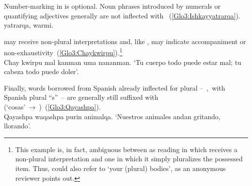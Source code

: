 {\noindent
Number-marking in \SYQ{} is optional. Noun phrases introduced by numerals or quantifying adjectives generally are not inflected with ~(\ref{Glo3:Ishkayyatrarqa}).\\

%
{ yatrarqa,  warmi.}%
{}%
{}{}%

\noindent
{} may receive non-plural interpretations and, like , may indicate accompaniment or non-exhaustivity~(\ref{Glo3:Chaykwirpu}).\footnote{This example is, in fact, ambiguous between as reading in which  receives a non-plural interpretation and one in which it simply pluralizes the possessed item. Thus,  could also refer to ‘your (plural) bodies’, as an anonymous reviewer points out.}\\

%
{Chay kwirpu mal kanman uma nananman.}%
{}%
{‘Tu cuerpo todo puede estar mal; tu cabeza todo puede doler’.}%
{}{}%

\noindent
Finally, words borrowed from Spanish already inflected for plural --~\ie,~with Spanish plural “s”~-- are generally still suffixed with  (‘cosas’~→~)~(\ref{Glo3:Qayashpa}).\\

%
{Qayashpa waqashpa purin animalqa.}%
{}%
{‘Nuestros animales andan gritando, llorando’.}%
{}{}%

}

